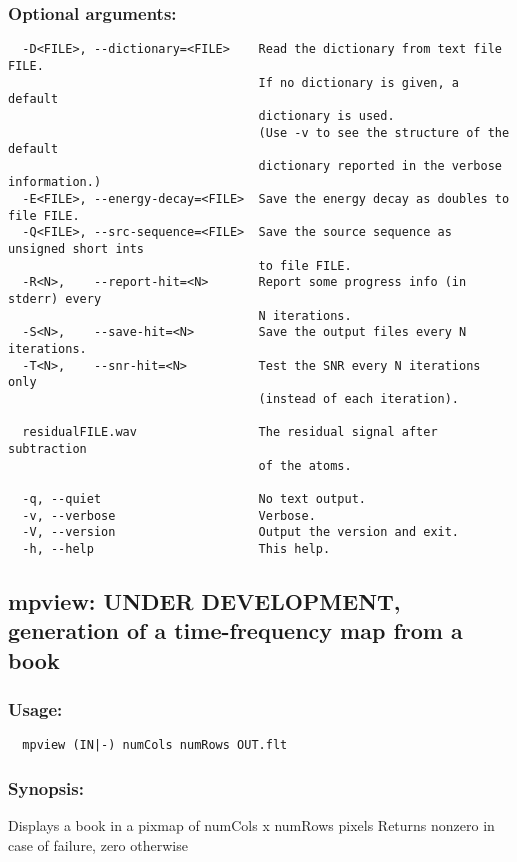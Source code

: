 \documentclass[11pt,a4paper]{article}
\begin{document}
\subsubsection*{Optional arguments:}
\begin{verbatim}
  -D<FILE>, --dictionary=<FILE>    Read the dictionary from text file FILE.
                                   If no dictionary is given, a default
                                   dictionary is used.
                                   (Use -v to see the structure of the default
                                   dictionary reported in the verbose information.)
  -E<FILE>, --energy-decay=<FILE>  Save the energy decay as doubles to file FILE.
  -Q<FILE>, --src-sequence=<FILE>  Save the source sequence as unsigned short ints
                                   to file FILE.
  -R<N>,    --report-hit=<N>       Report some progress info (in stderr) every
                                   N iterations.
  -S<N>,    --save-hit=<N>         Save the output files every N iterations.
  -T<N>,    --snr-hit=<N>          Test the SNR every N iterations only
                                   (instead of each iteration).

  residualFILE.wav                 The residual signal after subtraction
                                   of the atoms.

  -q, --quiet                      No text output.
  -v, --verbose                    Verbose.
  -V, --version                    Output the version and exit.
  -h, --help                       This help.
\end{verbatim}


\clearpage
\subsection{mpview: UNDER DEVELOPMENT, generation of a time-frequency map from
  a book}

\subsubsection*{Usage:}
\begin{verbatim}
  mpview (IN|-) numCols numRows OUT.flt
\end{verbatim}

\subsubsection*{Synopsis:}
Displays a book in a pixmap of numCols x numRows pixels Returns nonzero in case
of failure, zero otherwise
\end{document}
